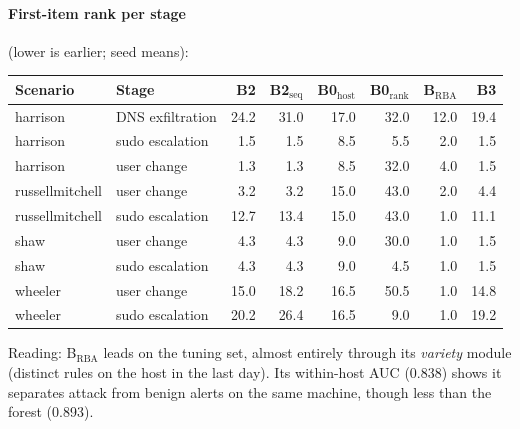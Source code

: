 \documentclass[10.5pt,a4paper]{article}
\begin{document}
\paragraph{First-item rank per stage} (lower is earlier; seed means):
\begin{center}\small
\begin{tabular}{@{}l l rrrrrr@{}}
\toprule
Scenario & Stage & \textbf{B2} & B2$_\mathrm{seq}$ & B0$_\mathrm{host}$ & B0$_\mathrm{rank}$ & B$_\mathrm{RBA}$ & \textbf{B3} \\
\midrule
harrison & DNS exfiltration & 24.2 & 31.0 & 17.0 & 32.0 & 12.0 & 19.4 \\
harrison & sudo escalation & 1.5 & 1.5 & 8.5 & 5.5 & 2.0 & 1.5 \\
harrison & user change & 1.3 & 1.3 & 8.5 & 32.0 & 4.0 & 1.5 \\
russellmitchell & user change & 3.2 & 3.2 & 15.0 & 43.0 & 2.0 & 4.4 \\
russellmitchell & sudo escalation & 12.7 & 13.4 & 15.0 & 43.0 & 1.0 & 11.1 \\
shaw & user change & 4.3 & 4.3 & 9.0 & 30.0 & 1.0 & 1.5 \\
shaw & sudo escalation & 4.3 & 4.3 & 9.0 & 4.5 & 1.0 & 1.5 \\
wheeler & user change & 15.0 & 18.2 & 16.5 & 50.5 & 1.0 & 14.8 \\
wheeler & sudo escalation & 20.2 & 26.4 & 16.5 & 9.0 & 1.0 & 19.2 \\
\bottomrule
\end{tabular}
\end{center}

\noindent Reading: B$_\mathrm{RBA}$ leads on the tuning set, almost entirely through its \emph{variety} module (distinct rules on the host in the last day). Its within-host AUC (0.838) shows it separates attack from benign alerts on the same machine, though less than the forest (0.893).
\end{document}

